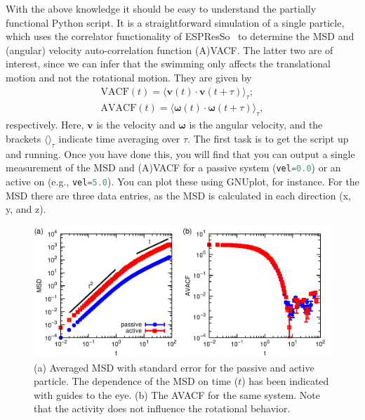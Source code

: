 \documentclass[aip,jcp,reprint,a4paper,onecolumn,amsmath]{revtex4-1}
\newcommand{\es}{\mbox{\textsf{ESPResSo}}\xspace}
\newcommand\codees{\lstinline[language=python]}
\begin{document}
With the above knowledge it should be easy to understand the partially functional Python script. It is a straightforward simulation of a single particle, which uses the correlator functionality of \es{}~\cite{Arnold_13,UG} to determine the MSD and (angular) velocity auto-correlation function (A)VACF. The latter two are of interest, since we can infer that the swimming only affects the translational motion and not the rotational motion. They are given by
\begin{eqnarray}
\label{eq:vacf} \mathrm{VACF}(t) = \langle \mathbf{v}(t) \cdot \mathbf{v}(t + \tau) \rangle_{\tau}; \\
\label{eq:avacf} \mathrm{AVACF}(t) = \langle \boldsymbol{\omega}(t) \cdot \boldsymbol{\omega}(t + \tau) \rangle_{\tau} ,
\end{eqnarray}
respectively. Here, $\mathbf{v}$ is the velocity and $\boldsymbol{\omega}$ is the angular velocity, and the brackets $\langle \rangle_{\tau}$ indicate time averaging over $\tau$. The first task is to get the script up and running. Once you have done this, you will find that you can output a single measurement of the MSD and (A)VACF for a passive system (\codees{vel=0.0}) or an active on (e.g., \codees{vel=5.0}). You can plot these using GNUplot, for instance. For the MSD there are three data entries, as the MSD is calculated in each direction (x, y, and z).

\begin{figure}[!htb]
\begin{center}
\includegraphics[scale=0.75]{FIGURES/enhanced}
\end{center}
\caption{\label{fig:enhanced}(a) Averaged MSD with standard error for the passive and active particle. The dependence of the MSD on time ($t$) has been indicated with guides to the eye. (b) The AVACF for the same system. Note that the activity does not influence the rotational behavior.}
\end{figure}
\end{document}
